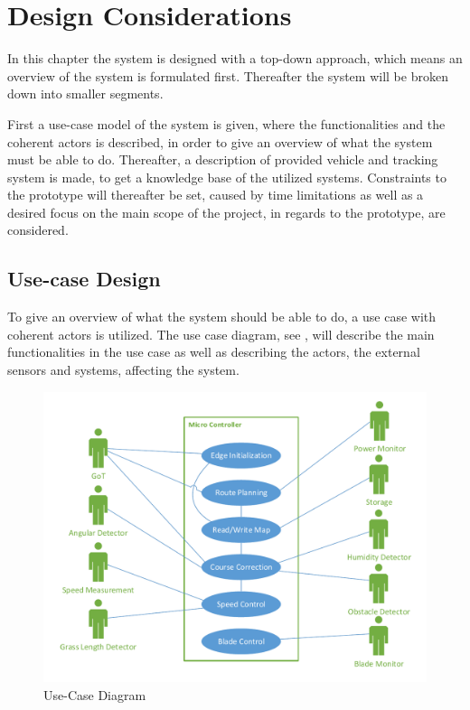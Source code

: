 \chapter{Design Considerations}
\vspace{-5 mm}
In this chapter the system is designed with a top-down approach, which means an overview of the system is formulated first. Thereafter the system will be broken down into smaller segments.

First a use-case model of the system is given, where the functionalities and the coherent actors is described, in order to give an overview of what the system must be able to do. Thereafter, a description of provided vehicle and tracking system is made, to get a knowledge  base of the utilized systems. Constraints to the prototype will thereafter be set, caused by time limitations as well as a desired focus on the main scope of the project, in regards to the prototype, are considered.
\vspace{-4 mm}
\section{Use-case Design} \label{sec:UseCase}
To give an overview of what the system should be able to do, a use case with coherent actors is utilized. The use case diagram, see , will describe the main functionalities in the use case as well as describing the actors, the external sensors and systems, affecting the system.

%
 \begin{figure}[H]
	\centering
	\includegraphics[scale=0.8]{figures/P5UseCase.pdf}
	\caption{Use-Case Diagram}
	\label{fig:usecase}
\end{figure}

